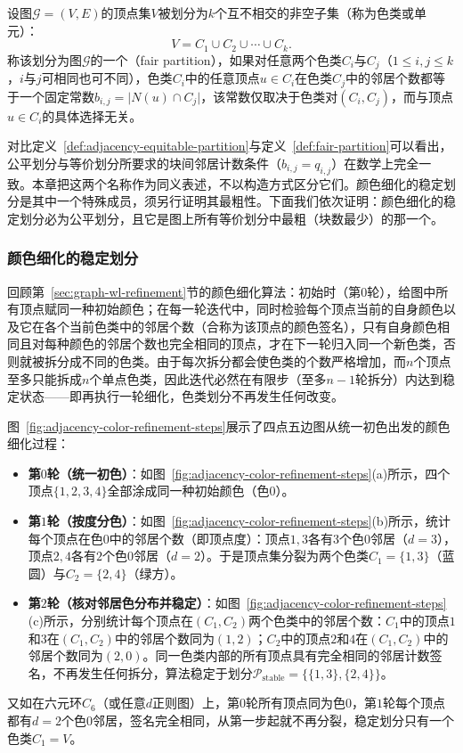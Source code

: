 \begin{definition}[公平划分]
\label{def:fair-partition}
设图$\mathcal G=(V,E)$的顶点集$V$被划分为$k$个互不相交的非空子集（称为色类或单元）：
\[
V=C_1\cup C_2\cup\cdots\cup C_k.
\]
称该划分为图$\mathcal G$的一个（fair partition），如果对任意两个色类$C_i$与$C_j$（$1\leq i,j\leq k$，$i$与$j$可相同也可不同），色类$C_i$中的任意顶点$u\in C_i$在色类$C_j$中的邻居个数都等于一个固定常数$b_{i,j}=\bigl|N(u)\cap C_j\bigr|$，该常数仅取决于色类对$(C_i,C_j)$，而与顶点$u\in C_i$的具体选择无关。
\end{definition}

对比定义~\ref{def:adjacency-equitable-partition}与定义~\ref{def:fair-partition}可以看出，公平划分与等价划分所要求的块间邻居计数条件（$b_{i,j}=q_{i,j}$）在数学上完全一致。本章把这两个名称作为同义表述，不以构造方式区分它们。颜色细化的稳定划分是其中一个特殊成员，须另行证明其最粗性。下面我们依次证明：颜色细化的稳定划分必为公平划分，且它是图上所有等价划分中最粗（块数最少）的那一个。

\subsubsection{颜色细化的稳定划分}
\label{sec:adjacency-color-refinement-stable}

回顾第~\ref{sec:graph-wl-refinement}节的颜色细化算法：初始时（第$0$轮），给图中所有顶点赋同一种初始颜色；在每一轮迭代中，同时检验每个顶点当前的自身颜色以及它在各个当前色类中的邻居个数（合称为该顶点的颜色签名），只有自身颜色相同且对每种颜色的邻居个数也完全相同的顶点，才在下一轮归入同一个新色类，否则就被拆分成不同的色类。由于每次拆分都会使色类的个数严格增加，而$n$个顶点至多只能拆成$n$个单点色类，因此迭代必然在有限步（至多$n-1$轮拆分）内达到稳定状态——即再执行一轮细化，色类划分不再发生任何改变。

图~\ref{fig:adjacency-color-refinement-steps}展示了四点五边图从统一初色出发的颜色细化过程：
\begin{itemize}
\item \textbf{第$0$轮（统一初色）}：如图~\ref{fig:adjacency-color-refinement-steps}(a)所示，四个顶点$\{1,2,3,4\}$全部涂成同一种初始颜色（色$0$）。
\item \textbf{第$1$轮（按度分色）}：如图~\ref{fig:adjacency-color-refinement-steps}(b)所示，统计每个顶点在色$0$中的邻居个数（即顶点度）：顶点$1,3$各有$3$个色$0$邻居（$d=3$），顶点$2,4$各有$2$个色$0$邻居（$d=2$）。于是顶点集分裂为两个色类$C_1=\{1,3\}$（蓝圆）与$C_2=\{2,4\}$（绿方）。
\item \textbf{第$2$轮（核对邻居色分布并稳定）}：如图~\ref{fig:adjacency-color-refinement-steps}(c)所示，分别统计每个顶点在$(C_1,C_2)$两个色类中的邻居个数：$C_1$中的顶点$1$和$3$在$(C_1,C_2)$中的邻居个数同为$(1,2)$；$C_2$中的顶点$2$和$4$在$(C_1,C_2)$中的邻居个数同为$(2,0)$。同一色类内部的所有顶点具有完全相同的邻居计数签名，不再发生任何拆分，算法稳定于划分$\mathcal P_{\mathrm{stable}}=\bigl\{\{1,3\},\{2,4\}\bigr\}$。
\end{itemize}
又如在六元环$C_6$（或任意$d$正则图）上，第$0$轮所有顶点同为色$0$，第$1$轮每个顶点都有$d=2$个色$0$邻居，签名完全相同，从第一步起就不再分裂，稳定划分只有一个色类$C_1=V$。

